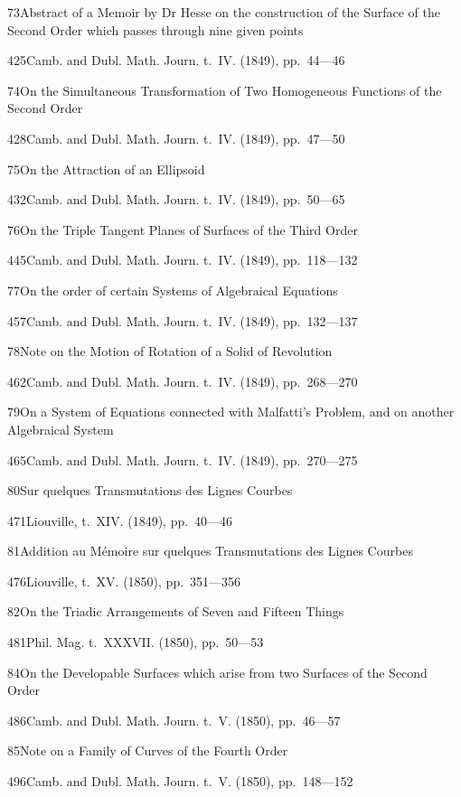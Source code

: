 \documentclass[11pt,a4paper]{book}
\providecommand{\tocentry}[2]{#1\dotfill #2\par}
\begin{document}
\tocentry{73}{Abstract of a Memoir by Dr Hesse on the construction of the Surface of the Second Order which passes through nine given points}{425}{Camb. and Dubl. Math. Journ. t.~IV. (1849), pp.~44---46}

\tocentry{74}{On the Simultaneous Transformation of Two Homogeneous Functions of the Second Order}{428}{Camb. and Dubl. Math. Journ. t.~IV. (1849), pp.~47---50}

\tocentry{75}{On the Attraction of an Ellipsoid}{432}{Camb. and Dubl. Math. Journ. t.~IV. (1849), pp.~50---65}

\tocentry{76}{On the Triple Tangent Planes of Surfaces of the Third Order}{445}{Camb. and Dubl. Math. Journ. t.~IV. (1849), pp.~118---132}

\tocentry{77}{On the order of certain Systems of Algebraical Equations}{457}{Camb. and Dubl. Math. Journ. t.~IV. (1849), pp.~132---137}

\tocentry{78}{Note on the Motion of Rotation of a Solid of Revolution}{462}{Camb. and Dubl. Math. Journ. t.~IV. (1849), pp.~268---270}

\tocentry{79}{On a System of Equations connected with Malfatti's Problem, and on another Algebraical System}{465}{Camb. and Dubl. Math. Journ. t.~IV. (1849), pp.~270---275}

\newpage

\tocentry{80}{Sur quelques Transmutations des Lignes Courbes}{471}{Liouville, t.~XIV. (1849), pp.~40---46}

\tocentry{81}{Addition au M\'{e}moire sur quelques Transmutations des Lignes Courbes}{476}{Liouville, t.~XV. (1850), pp.~351---356}

\tocentry{82}{On the Triadic Arrangements of Seven and Fifteen Things}{481}{Phil. Mag. t.~XXXVII. (1850), pp.~50---53}


\tocentry{84}{On the Developable Surfaces which arise from two Surfaces of the Second Order}{486}{Camb. and Dubl. Math. Journ. t.~V. (1850), pp.~46---57}

\tocentry{85}{Note on a Family of Curves of the Fourth Order}{496}{Camb. and Dubl. Math. Journ. t.~V. (1850), pp.~148---152}

\end{document}
